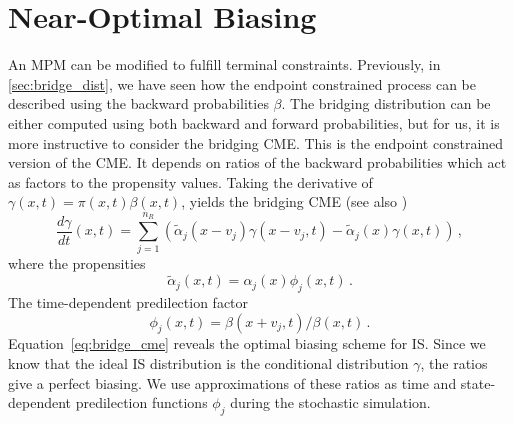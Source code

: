 \section{Near-Optimal Biasing}
An \ac{MPM} can be modified to fulfill terminal constraints.
Previously, in \autoref{sec:bridge_dist}, we have seen how the
endpoint constrained process can be described using the backward
probabilities $\beta$.
The bridging distribution can be either computed using both backward
and forward probabilities, but for us, it is more instructive to
consider the bridging \ac{CME}.
This is the endpoint constrained version of the \ac{CME}.
It depends on ratios of the backward probabilities which act as
factors to the propensity values.
Taking the derivative of $\gamma(x,t)=\pi(x,t)\beta(x,t)$, yields the
bridging \ac{CME} (see also \citet{huang2016reconstructing})
\begin{equation}\label{eq:bridge_cme}
  \frac{d\gamma}{d t} ( x,t) =
  \sum_{j=1}^{n_R}\left(
    \tilde{\alpha}_j( x- v_j)\gamma( x- v_j,t) - \tilde{\alpha}_j(
    x)\gamma( x,t)
  \right)\,,
\end{equation}
where the propensities
\begin{equation}
  \tilde{\alpha}_j(x, t) = \alpha_j(x)\phi_j(x, t)\,.
\end{equation}
The time-dependent predilection factor
\begin{equation}\label{eq:dyn_predilection}
  \phi_j(x, t) = {\beta(x + v_j, t)}/{\beta(x, t)}\,.
\end{equation}
Equation~\eqref{eq:bridge_cme} reveals the optimal biasing scheme for \ac{IS}.
Since we know that the ideal \ac{IS} distribution is the conditional
distribution $\gamma$, the ratios
give a perfect biasing.
We use approximations of these ratios as time and state-dependent
predilection functions $\phi_j$ during the stochastic simulation.


